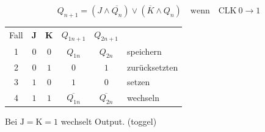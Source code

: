 \begin{equation*}
    Q_{n + 1} = \left(J \land \overline{Q_n}\right) \lor \left(\overline{K} \land Q_n\right) \quad \text{wenn} \quad \text{CLK}~0\rightarrow 1 
\end{equation*}
\begin{center}
    \begin{tabular}{c|c c|c c l}
        Fall & \textbf{J} & \textbf{K} & $Q_{1n + 1}$ & $Q_{2n + 1}$ & \\
        \cline{1-5}
        1 & $0$ & $0$ & $Q_{1n}$ & $Q_{2n}$ & speichern\\        
        2 & $0$ & $1$ & $0$ & $1$ & zurücksetzten\\        
        3 & $1$ & $0$ & $1$ & $0$ & setzen\\        
        4 & $1$ & $1$ & $\overline{Q_{1n}}$ & $\overline{Q_{2n}}$ & wechseln\\        
    \end{tabular}
\end{center}
Bei $\text{J}=\text{K}=1$ wechselt Output. (toggel)
